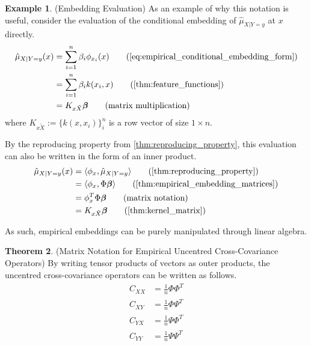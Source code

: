 \documentclass[twoside]{article} \usepackage{aistats2017}
\theoremstyle{definition}
\newtheorem{theorem}{Theorem}[section]
\newtheorem{example}[theorem]{Example}
\newcommand{\rv}[1]{{#1}}
\newcommand{\ds}[1]{\tilde{#1}}
\newcommand{\inner}[2]{{\langle #1, #2 \rangle}}
\newcommand{\hatmuXy}{\hat{\mu}_{\rv{X} | \rv{Y} = y}}
\newcommand{\hatCxy}{\hat{C}_{\rv{X} \rv{Y}}}
\newcommand{\hatCyx}{\hat{C}_{\rv{Y} \rv{X}}}
\newcommand{\hatCxx}{\hat{C}_{\rv{X} \rv{X}}}
\newcommand{\hatCyy}{\hat{C}_{\rv{Y} \rv{Y}}}
\begin{document}
		\begin{example} \label{ex:embedding_evaluation}
			(Embedding Evaluation)
			As an example of why this notation is useful, consider the evaluation of the conditional embedding of $\hatmuXy$ at $x$ directly.
			\begin{align*}
				\hatmuXy(x) &= \sum_{i = 1}^{n} \beta_{i} \phi_{x_{i}}(x) \tag{\cref{eq:empirical_conditional_embedding_form}} \\
				&= \sum_{i = 1}^{n} \beta_{i} k(x_{i}, x) \tag{\cref{thm:feature_functions}} \\
				&= K_{x \ds{X}} \bm{\beta} \tag{matrix multiplication}
			\end{align*}
			where $K_{x \ds{X}} := \{k(x, x_{i})\}_{i}^{n}$ is a row vector of size $1 \times n$.
			
			By the reproducing property from \cref{thm:reproducing_property}, this evaluation can also be written in the form of an inner product.
			\begin{align*}
				\hatmuXy(x) &= \inner{\phi_{x}}{\hatmuXy} \tag{\cref{thm:reproducing_property}}\\
				&= \inner{\phi_{x}}{\Phi \bm{\beta}} \tag{\cref{thm:empirical_embedding_matrices}}\\
				&= \phi_{x}^{T} \Phi \bm{\beta} \tag{matrix notation} \\
				&= K_{x \ds{X}} \bm{\beta} \tag{\cref{thm:kernel_matrix}}
			\end{align*}
			
			As such, empirical embeddings can be purely manipulated through linear algebra.
		\end{example}
		
		\begin{theorem} \label{thm:empirical_cross_cov_matrices}
			(Matrix Notation for Empirical Uncentred Cross-Covariance Operators)
			By writing tensor products of vectors as outer products, the uncentred cross-covariance operators can be written as follows.
			\begin{equation}
			\begin{aligned}
				\hatCxx &= \frac{1}{n} \Phi \Phi^{T} \\
				\hatCxy &= \frac{1}{n} \Phi \Psi^{T} \\
				\hatCyx &= \frac{1}{n} \Psi \Phi^{T} \\
				\hatCyy &= \frac{1}{n} \Psi \Psi^{T} \\
			\label{eq:empirical_cross_cov_matrices}
			\end{aligned}
			\end{equation}
		\end{theorem}
		
\end{document}
